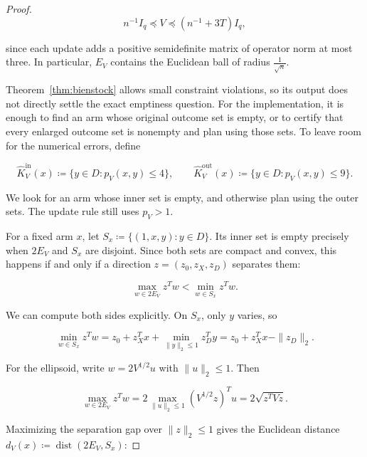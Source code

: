 {{\begin{proof}
\begin{equation*}
n^{- 1} I_{q} \preceq V \preceq \left( n^{- 1} + 3 T \right) I_{q} ,
\end{equation*}


since each update adds a positive semidefinite matrix of operator norm
at most three. In particular, $E_{V}$ contains the Euclidean ball of
radius $\frac{1}{\sqrt{n}}$.

Theorem~\ref{thm:bienstock} allows small constraint violations, so its output does not
directly settle the exact emptiness question. For the implementation,
it is enough to find an arm whose original outcome set is empty, or to
certify that every enlarged outcome set is nonempty and plan using those
sets. To leave room for the numerical errors, define

\begin{equation*}
\hat K_V^{\mathrm{in}}(x)\coloneqq\{y\in D:p_V(x,y)\le4\},
\qquad
\hat K_V^{\mathrm{out}}(x)\coloneqq\{y\in D:p_V(x,y)\le9\}.
\end{equation*}

We look for an arm whose inner set is empty, and otherwise plan using
the outer sets. The update rule still uses $p_V>1$.

For a fixed arm $x$, let $S_x\coloneqq\{(1,x,y):y\in D\}$. Its inner
set is empty precisely when $2E_V$ and $S_x$ are disjoint. Since both
sets are compact and convex, this happens if and only if a direction
$z=(z_0,z_X,z_D)$ separates them:

\begin{equation*}
\max_{w\in2E_V}z^T w<\min_{w\in S_x}z^T w.
\end{equation*}

We can compute both sides explicitly. On $S_x$, only $y$ varies, so

\begin{equation*}
\min_{w\in S_x}z^T w
=z_0+z_X^T x+\min_{\|y\|_2\le1}z_D^T y
=z_0+z_X^T x-\|z_D\|_2.
\end{equation*}

For the ellipsoid, write $w=2V^{1/2}u$ with $\|u\|_2\le1$. Then

\begin{equation*}
\max_{w\in2E_V}z^T w
=2\max_{\|u\|_2\le1}(V^{1/2}z)^T u
=2\sqrt{z^T Vz}.
\end{equation*}

Maximizing the separation gap over $\|z\|_2\le1$ gives the Euclidean
distance $d_V(x)\coloneqq\operatorname{dist}(2E_V,S_x)$:


\end{proof}}}
